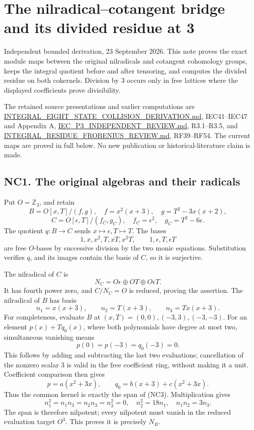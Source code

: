 \documentclass[
]{article}
\author{}
\date{}
\begin{document}
\section{The nilradical--cotangent bridge and its divided residue at
3}\label{the-nilradicalcotangent-bridge-and-its-divided-residue-at-3}

Independent bounded derivation, 23 September 2026. This note proves the
exact module maps between the original nilradicals and cotangent
cohomology groups, keeps the integral quotient before and after
tensoring, and computes the divided residue on both cokernels. Division
by 3 occurs only in free lattices where the displayed coefficients prove
divisibility.

The retained source presentations and earlier computations are
\url{INTEGRAL_EIGHT_STATE_COLLISION_DERIVATION.md}, IEC41--IEC47 and
Appendix A, \url{IEC_P3_INDEPENDENT_REVIEW.md}, R3.1--R3.5, and
\url{INTEGRAL_RESIDUE_FROBENIUS_REVIEW.md}, RF39--RF54. The current maps
are proved in full below. No new publication or historical-literature
claim is made.

\subsection{NC1. The original algebras and their
radicals}\label{nc1.-the-original-algebras-and-their-radicals}

Put \(O=\mathbb Z_3\), and retain \[
B=O[x,T]/(f,g),\quad
f=x^2(x+3),\quad g=T^2-3x(x+2),
\] \[
C=O[\epsilon,T]/(f_C,g_C),\quad
f_C=\epsilon^2,\quad g_C=T^2-6\epsilon.
\tag{NC1}
\] The quotient \(q:B\to C\) sends \(x\mapsto\epsilon,T\mapsto T\). The
bases \[
1,x,x^2,T,xT,x^2T,\qquad
1,\epsilon,T,\epsilon T
\tag{NC2}
\] are free \(O\)-bases by successive division by the two monic
equations. Substitution verifies \(q\), and its images contain the basis
of \(C\), so it is surjective.

The nilradical of \(C\) is \[
N_C=O\epsilon\oplus OT\oplus O\epsilon T.
\] It has fourth power zero, and \(C/N_C=O\) is reduced, proving the
assertion. The nilradical of \(B\) has basis \[
n_1=x(x+3),\qquad n_2=T(x+3),\qquad n_3=Tx(x+3).
\tag{NC3}
\] For completeness, evaluate \(B\) at \((x,T)=(0,0),(-3,3),(-3,-3)\).
For an element \(p(x)+Tq_0(x)\), where both polynomials have degree at
most two, simultaneous vanishing means \[
p(0)=p(-3)=q_0(-3)=0.
\] This follows by adding and subtracting the last two evaluations;
cancellation of the nonzero scalar 3 is valid in the free coefficient
ring, without making it a unit. Coefficient comparison then gives \[
p=a(x^2+3x),\qquad
q_0=b(x+3)+c(x^2+3x).
\] Thus the common kernel is exactly the span of (NC3). Multiplication
gives \[
n_1^2=n_1n_3=n_2n_3=n_3^2=0,\quad
n_2^2=18n_1,\quad n_1n_2=3n_3.
\] The span is therefore nilpotent; every nilpotent must vanish in the
reduced evaluation target \(O^3\). This proves it is precisely \(N_B\).
\end{document}
